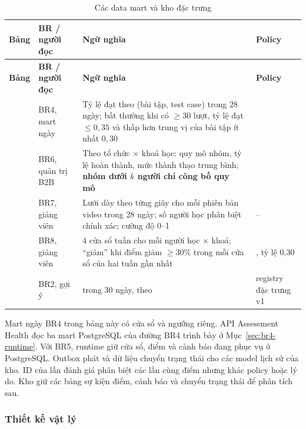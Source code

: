 {\small
\begin{longtable}{@{}L{3.6cm}L{2.0cm}L{6.0cm}L{2.9cm}@{}}
\caption{Các data mart và kho đặc trưng}\label{tab:marts}\\
\toprule
\textbf{Bảng} & \textbf{BR / người đọc} & \textbf{Ngữ nghĩa} & \textbf{Policy} \\
\midrule
\endfirsthead
\toprule
\textbf{Bảng} & \textbf{BR / người đọc} & \textbf{Ngữ nghĩa} & \textbf{Policy} \\
\midrule
\endhead
{} & BR4, mart ngày & Tỷ lệ đạt theo (bài tập, test case) trong 28 ngày; bất thường khi có $\ge 30$ lượt, tỷ lệ đạt $\le 0{,}35$ và thấp hơn trung vị của bài tập ít nhất $0{,}30$ &  \\
 & BR6, quản trị B2B & Theo tổ chức × khoá học: quy mô nhóm, tỷ lệ hoàn thành, mức thành thạo trung bình; \textbf{nhóm dưới $k$ người chỉ công bố quy mô}~\cite{sweeney2002} &  \\
 & BR7, giảng viên & Lưới dày theo từng giây cho mỗi phiên bản video trong 28 ngày; số người học phân biệt chính xác; cường độ 0--1 & -- \\
 & BR8, giảng viên & 4 cửa sổ tuần cho mỗi người học × khoá; ``giảm'' khi điểm giảm $\ge 30\%$ trong mỗi cửa sổ của hai tuần gần nhất & , tỷ lệ 0,30 \\
 & BR2, gợi ý &  trong 30 ngày, theo  & registry đặc trưng v1 \\
\bottomrule
\end{longtable}}

Mart ngày BR4 trong bảng này có cửa sổ và ngưỡng riêng. API Assessment Health đọc ba mart PostgreSQL của đường BR4 trình bày ở Mục~\ref{sec:br4-runtime}. Với BR5, runtime giữ cửa sổ, điểm và cảnh báo đang phục vụ ở PostgreSQL. Outbox phát  và dữ liệu chuyển trạng thái cho các model lịch sử của kho. ID của lần đánh giá phân biệt các lần cùng điểm nhưng khác policy hoặc lý do. Kho giữ các bảng sự kiện điểm, cảnh báo và chuyển trạng thái để phân tích sau.

\subsubsection{Thiết kế vật lý}

